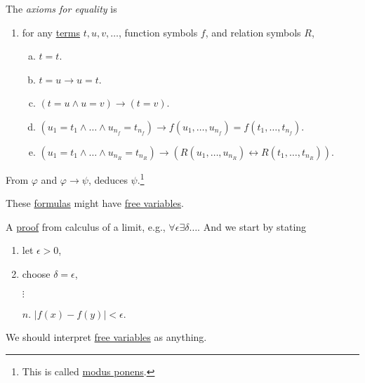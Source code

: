 \begin{definition}[Proof]
\begin{definition}
		\begin{definition}\label{def:axioms-for-equality}
			The \emph{axioms for equality} is
			\begin{enumerate}[label=(A\arabic*), resume]
				\item\label{A7} for any \hyperref[def:term]{terms} \(t, u, v, \dots \), function symbols \(f\), and relation symbols \(R\),
				\begin{enumerate}[(a)]
					\item\label{def:axioms-for-equality-a} \(t = t\).
					\item\label{def:axioms-for-equality-b} \(t = u \to  u = t\).
					\item\label{def:axioms-for-equality-c} \((t=u \land u = v) \to  (t = v)\).
					\item\label{def:axioms-for-equality-d} \((u_1 = t_1 \land \dots \land u_{n_f} = t_{n_f}) \to f(u_1, \dots , u_{n_f}) = f(t_1, \dots , t_{n_f})\).
					\item\label{def:axioms-for-equality-e} \((u_1 = t_1 \land \dots \land u_{n_R} = t_{n_R}) \to (R(u_1, \dots , u_{n_R}) \leftrightarrow R(t_1, \dots , t_{n_R}))\).
				\end{enumerate}
			\end{enumerate}
		\end{definition}
	\end{definition}

	\begin{definition}\label{def:rule-of-inference}
		From \(\varphi \) and \(\varphi \to \psi\), deduces \(\psi \).\footnote{This is called \href{https://en.wikipedia.org/wiki/Modus_ponens}{modus ponens}.}
	\end{definition}
\end{definition}

These \hyperref[def:formula]{formulas} might have \hyperref[def:free-variable]{free variables}.

\begin{eg}
	A \hyperref[def:proof]{proof} from calculus of a limit, e.g., \(\forall \epsilon \exists \delta \dots \). And we start by stating
	\begin{enumerate}
		\item let \(\epsilon > 0\),
		\item choose \(\delta =\epsilon \),
		\item[] \(\vdots\)
		\item[\(n\).] \(\vert f(x) - f(y) \vert < \epsilon \).
	\end{enumerate}
	We should interpret \hyperref[def:free-variable]{free variables} as anything.
\end{eg}

